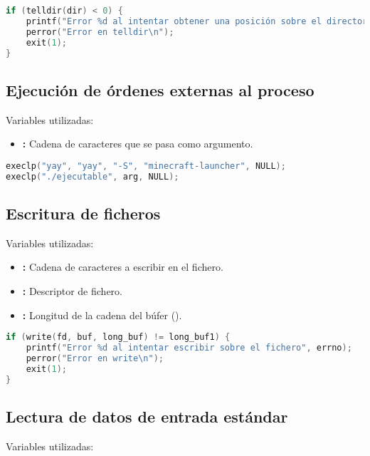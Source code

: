 \begin{lstlisting}[language=C]
if (telldir(dir) < 0) {
	printf("Error %d al intentar obtener una posición sobre el directorio", errno);
	perror("Error en telldir\n");
	exit(1);
}
\end{lstlisting}

\pagebreak

\subsection{Ejecución de órdenes externas al proceso}

Variables utilizadas:

\begin{itemize}
	\item{}\textbf{:} Cadena de caracteres que se pasa como argumento.
\end{itemize}

\begin{lstlisting}[language=C]
execlp("yay", "yay", "-S", "minecraft-launcher", NULL);
execlp("./ejecutable", arg, NULL);
\end{lstlisting}

\subsection{Escritura de ficheros}

Variables utilizadas:

\begin{itemize}
	\item{}\textbf{:} Cadena de caracteres a escribir en el fichero.
	\item{}\textbf{:} Descriptor de fichero.
	\item{}\textbf{:} Longitud de la cadena del  búfer ().
\end{itemize}

\begin{lstlisting}[language=C]
if (write(fd, buf, long_buf) != long_buf1) {
	printf("Error %d al intentar escribir sobre el fichero", errno);
	perror("Error en write\n");
	exit(1);
}
\end{lstlisting}

\subsection{Lectura de datos de entrada estándar}

Variables utilizadas:

